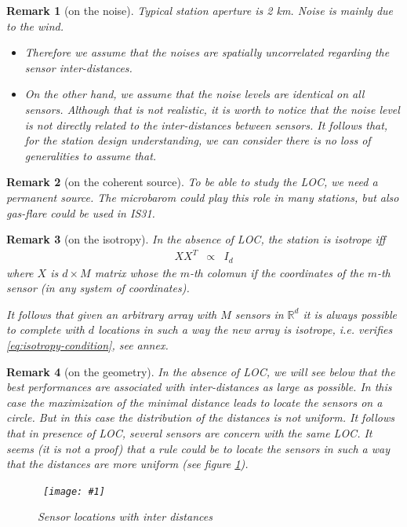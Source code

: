 \documentclass[a4paper, 12pt]{report}
\newcommand{\figscale}[4]{
\begin{figure}[hbtp]
\centerline{
    \hbox{ \texttt{[image: \#1]} }
}
\begin{center}
\parbox{14 cm}
{
    \caption{\protect\small\it  {#2}}
    \label {#3}
}
\end{center}

\end{figure}}
\newtheorem{remark}{Remark}
\begin{document}
\begin{remark}[on the noise]
Typical station aperture  is 2 km. Noise is mainly due to the wind.
\begin{itemize}
\item
Therefore we assume that the noises are spatially uncorrelated regarding the sensor inter-distances.
\item
On the other hand, we assume that the noise levels are identical on all sensors. Although that is not realistic, it is worth to notice that the noise level is not directly related to the inter-distances between sensors. It follows that, for the station design understanding, we can consider there is no loss of generalities to assume that.
\end{itemize}
\end{remark}

\begin{remark}[on the coherent source]
To be able to study the LOC, we need a permanent source. The microbarom could play this role in many stations, but also gas-flare could be used in IS31.
\end{remark}

\begin{remark}[on the isotropy]
In the absence of LOC, the station is isotrope iff 
\begin{eqnarray}
 \label{eq:isotropy-condition}
XX^{T}&\propto&I_{d}
\end{eqnarray}
where $X$ is $d\times M$ matrix whose the $m$-th colomun if the coordinates of the $m$-th sensor (in any  system of coordinates). 

It follows that  given an arbitrary array with $M$ sensors in $\mathds{R}^{d}$ it is always possible to complete with $d$ locations in such a way the new array is isotrope, i.e. verifies \eqref{eq:isotropy-condition}, see annex.

\end{remark}

\begin{remark}[on the geometry]
In the absence of LOC, we will see below that the best performances are associated with inter-distances as large as possible. In this case the maximization of the minimal distance leads to locate the sensors on a circle. But in this case the distribution of the distances is not uniform. It follows that in presence of LOC, several sensors are concern with the same LOC. It seems (it is not a proof) that a rule could be to locate the sensors in such a way that the distances are more uniform (see figure \ref{fig:uniforinterdistances}).

\figscale{../figures/uniforinterdistances.pdf}{Sensor locations with inter distances}{fig:uniforinterdistances}{0.9}

\end{remark}
\end{document}
